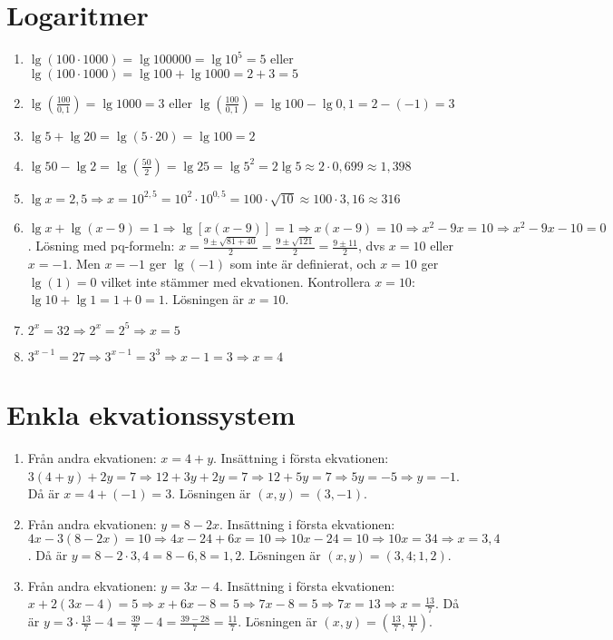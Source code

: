 \documentclass[a4paper,11pt]{article}
\begin{document}
\section{Logaritmer}
\begin{enumerate}[label=\textbf{\arabic*.}]
    \item $\lg(100 \cdot 1000) = \lg 100000 = \lg 10^5 = 5$ eller $\lg(100 \cdot 1000) = \lg 100 + \lg 1000 = 2 + 3 = 5$
    \item $\lg\left(\frac{100}{0,1}\right) = \lg 1000 = 3$ eller $\lg\left(\frac{100}{0,1}\right) = \lg 100 - \lg 0,1 = 2 - (-1) = 3$
    \item $\lg 5 + \lg 20 = \lg(5 \cdot 20) = \lg 100 = 2$
    \item $\lg 50 - \lg 2 = \lg\left(\frac{50}{2}\right) = \lg 25 = \lg 5^2 = 2 \lg 5 \approx 2 \cdot 0,699 \approx 1,398$
    \item $\lg x = 2,5 \Rightarrow x = 10^{2,5} = 10^2 \cdot 10^{0,5} = 100 \cdot \sqrt{10} \approx 100 \cdot 3,16 \approx 316$
    \item $\lg x + \lg (x-9) = 1 \Rightarrow \lg[x(x-9)] = 1 \Rightarrow x(x-9) = 10 \Rightarrow x^2 - 9x = 10 \Rightarrow x^2 - 9x - 10 = 0$. Lösning med pq-formeln: $x = \frac{9 \pm \sqrt{81+40}}{2} = \frac{9 \pm \sqrt{121}}{2} = \frac{9 \pm 11}{2}$, dvs $x = 10$ eller $x = -1$. Men $x = -1$ ger $\lg(-1)$ som inte är definierat, och $x = 10$ ger $\lg(1)=0$ vilket inte stämmer med ekvationen. Kontrollera $x = 10$: $\lg 10 + \lg 1 = 1 + 0 = 1$. Lösningen är $x = 10$.
    \item $2^x = 32 \Rightarrow 2^x = 2^5 \Rightarrow x = 5$
    \item $3^{x-1} = 27 \Rightarrow 3^{x-1} = 3^3 \Rightarrow x-1 = 3 \Rightarrow x = 4$
\end{enumerate}

\section{Enkla ekvationssystem}
\begin{enumerate}[label=\textbf{\arabic*.}]
    \item Från andra ekvationen: $x = 4 + y$. Insättning i första ekvationen: $3(4+y) + 2y = 7 \Rightarrow 12 + 3y + 2y = 7 \Rightarrow 12 + 5y = 7 \Rightarrow 5y = -5 \Rightarrow y = -1$. Då är $x = 4 + (-1) = 3$. Lösningen är $(x,y) = (3,-1)$.
    
    \item Från andra ekvationen: $y = 8 - 2x$. Insättning i första ekvationen: $4x - 3(8-2x) = 10 \Rightarrow 4x - 24 + 6x = 10 \Rightarrow 10x - 24 = 10 \Rightarrow 10x = 34 \Rightarrow x = 3,4$. Då är $y = 8 - 2 \cdot 3,4 = 8 - 6,8 = 1,2$. Lösningen är $(x,y) = (3,4; 1,2)$.
    
    \item Från andra ekvationen: $y = 3x - 4$. Insättning i första ekvationen: $x + 2(3x-4) = 5 \Rightarrow x + 6x - 8 = 5 \Rightarrow 7x - 8 = 5 \Rightarrow 7x = 13 \Rightarrow x = \frac{13}{7}$. Då är $y = 3 \cdot \frac{13}{7} - 4 = \frac{39}{7} - 4 = \frac{39-28}{7} = \frac{11}{7}$. Lösningen är $(x,y) = (\frac{13}{7}, \frac{11}{7})$.
\end{enumerate}
\end{document}

